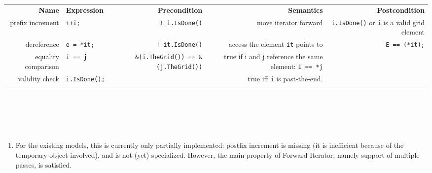    

\begin{tabularx}{15cm}{RlRRR} 
  \T \\ \hline
  \bf  Name     &
  \bf  Expression &
  \bf  Precondition&
  \bf  Semantics &
  \bf  Postcondition
  \\ 
  \hline
  prefix increment  &
  {\tt ++i;} &
  {\tt ! i.IsDone()} &
  move iterator forward  & 
  {\tt i.IsDone()} or {\tt *i} is a valid grid element 
  \\ 
  dereference  &
  {\tt e = *it;} & 
  {\tt ! it.IsDone()} &  
  access the element {\tt it} points to &
  {\tt E == (*it);} 
  \\ 
  equality comparison  &
  {\tt i == j} & 
  {\tt \&(i.TheGrid()) == \&(j.TheGrid())} &  
  true if i and j reference the same element:  {\tt *i == *j}  &
  ~ 
  \\ 
  validity check  &
  {\tt i.IsDone();} & 
  ~ &  
  true iff {\tt i} is past-the-end. &
  ~ 
  \T \\  \hline  \\
\end{tabularx}

\W{}

\\
\\
\\
\\
    
\W{}

\begin{enumerate}
\item 
  For the existing models, this is currently only partially implemented: postfix increment is missing
  (it is inefficient because of the temporary object involved), and
  is not (yet) specialized.
  However, the main property of Forward Iterator, namely support of multiple passes,
  is satisfied.
\end{enumerate}

 ~
 ~

  

